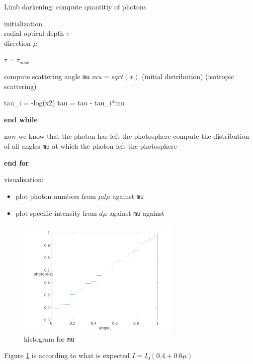 \documentclass[../main/main.tex]{subfiles}
\begin{document}
\begin{algorithm}
\caption{Limb darkening: compute quantitiy of photons}\label{limb_darkening}
\begin{algorithmic}
\State initialization \\
\quad radial optical depth $\tau$ \\
\quad direction $\mu$


\State $\boxed{\tau = \tau_{max}}$
	
	\State compute scattering angle \texttt{mu}
	 $\boxed{mu = sqrt(x)}$ (initial distribution)
	 (isotropic scattering)
	\EndIf
	
	\State tau\_i = -log(x2) 
	\State tau = tau - tau\_i*mu	
		
	\EndWhile
	\State \textbf{end while}

	\State now we know that the photon has left the photosphere	
	\State compute the distribution of all angles \texttt{mu} at which the photon left the photosphere
	
\EndFor
\State \textbf{end for}

\State visualisation: 
	\begin{itemize}
	\item plot photon numbers from $\mu d\mu$ against \texttt{mu}
	\item plot specific intensity from $d\mu$ against \texttt{mu} against 
	\end{itemize}


\end{algorithmic}
\end{algorithm}


\begin{figure}[!htp]
\centering
\includegraphics[width=0.7\textwidth]{../../introductory_exercises/limb_darkening/number_channels20number_photons100000max_opt_depth10.png}
\caption{histogram for \texttt{mu}}
\label{2D_mu}
\end{figure}
Figure \ref{2D_mu} is according to what is expected $I = I_0(0.4+0.6\mu)$
\end{document}
